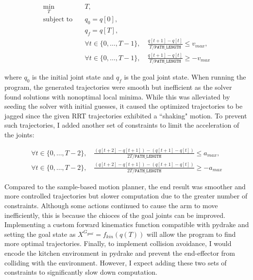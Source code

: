 \documentclass{article}
\begin{document}
\begin{equation*}
\begin{aligned}
    \min_T\quad & T,\\
    \textrm{subject to}\quad & q_0=q[0],\\
                             & q_f=q[T],\\
                             & \forall t\in\{0,\dots,T-1\},\quad \frac{q[t+1]-q[t]}{T/\texttt{PATH\_LENGTH}}\le v_{max},\\
                             & \forall t\in\{0,\dots,T-1\},\quad \frac{q[t+1]-q[t]}{T/\texttt{PATH\_LENGTH}}\ge -v_{max}
\end{aligned}
\end{equation*}

where $q_0$ is the initial joint state and $q_f$ is the goal joint state. When running the program, the generated trajectories were smooth but inefficient as the solver found solutions with nonoptimal local minima. While this was alleviated by seeding the solver with initial guesses, it caused the optimized trajectories to be jagged since the given RRT trajectories exhibited a ``shaking" motion. To prevent such trajectories, I added another set of constraints to limit the acceleration of the joints:

\begin{equation*}
\begin{aligned}
    \forall t\in\{0,\dots,T-2\},\quad \frac{(q[t+2]-q[t+1])-(q[t+1]-q[t])}{2T/\texttt{PATH\_LENGTH}}\le a_{max},\\
    \forall t\in\{0,\dots,T-2\},\quad \frac{(q[t+2]-q[t+1])-(q[t+1]-q[t])}{2T/\texttt{PATH\_LENGTH}}\ge -a_{max}
\end{aligned}
\end{equation*}

Compared to the sample-based motion planner, the end result was smoother and more controlled trajectories but slower computation due to the greater number of constraints. Although some actions continued to cause the arm to move inefficiently, this is because the chioces of the goal joints can be improved. Implementing a custom forward kinematics function compatible with pydrake and setting the goal state as $X^{G_{goal}}=f_{kin}(q(T))$ will allow the program to find more optimal trajectories. Finally, to implement collision avoidance, I would encode the kitchen environment in pydrake and prevent the end-effector from colliding with the environment. However, I expect adding these two sets of constraints to significantly slow down computation.
\end{document}

